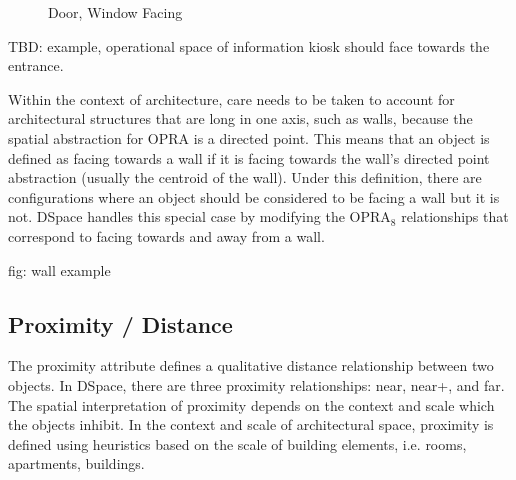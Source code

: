 \documentclass[12pt]{ucthesis}
\begin{document}
\begin{figure}[H]
 \centering
  \hspace{10 mm}
 \caption{Door, Window Facing}
\label{door-window-facing}
\end{figure}

TBD: example, operational space of information kiosk should face towards the entrance.

Within the context of architecture, care needs to be taken to account for architectural structures that are long in one axis, such as walls, because the spatial abstraction for OPRA is a directed point. This means that an object is defined as facing towards a wall if it is facing towards the wall's directed point abstraction (usually the centroid of the wall). Under this definition, there are configurations where an object should be considered to be facing a wall but it is not. DSpace handles this special case by modifying the OPRA$_{8}$ relationships that correspond to facing towards and away from a wall. 

fig: wall example

\subsection{Proximity / Distance}
The proximity attribute defines a qualitative distance relationship between two objects. In DSpace, there are three proximity relationships: near, near+, and far. The spatial interpretation of proximity depends on the context and scale which the objects inhibit. In the context and scale of architectural space, proximity is defined using heuristics based on the scale of building elements, i.e. rooms, apartments, buildings.
\end{document}
